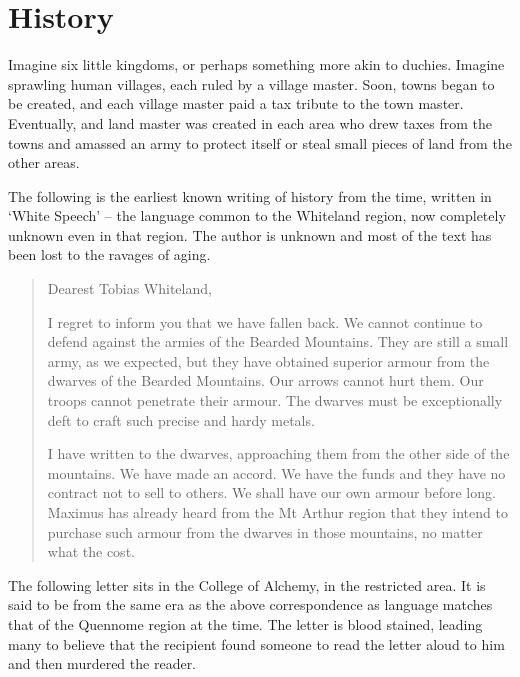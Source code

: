 \chapter{History}


Imagine six little kingdoms, or perhaps something more akin to duchies.  Imagine sprawling human villages, each ruled by a village master.  Soon, towns began to be created, and each village master paid a tax tribute to the town master.  Eventually, and land master was created in each area who drew taxes from the towns and amassed an army to protect itself or steal small pieces of land from the other areas.

	The following is the earliest known writing of history from the time, written in `White Speech' -- the language common to the Whiteland region, now completely unknown even in that region.  The author is unknown and most of the text has been lost to the ravages of aging.

\begin{quotation}
Dearest Tobias Whiteland,

I regret to inform you that we have fallen back.  We cannot continue to defend against the armies of the Bearded Mountains.  They are still a small army, as we expected, but they have obtained superior armour from the dwarves of the Bearded Mountains.  Our arrows cannot hurt them.  Our troops cannot penetrate their armour.  The dwarves must be exceptionally deft to craft such precise and hardy metals.

	I have written to the dwarves, approaching them from the other side of the mountains.  We have made an accord.  We have the funds and they have no contract not to sell to others.  We shall have our own armour before long.  Maximus has already heard from the Mt Arthur region that they intend to purchase such armour from the dwarves in those mountains, no matter what the cost.

\end{quotation}

The following letter sits in the College of Alchemy, in the restricted area.   It is said to be from the same era as the above correspondence as language matches that of the Quennome region at the time.  The letter is blood stained, leading many to believe that the recipient found someone to read the letter aloud to him and then murdered the reader.

